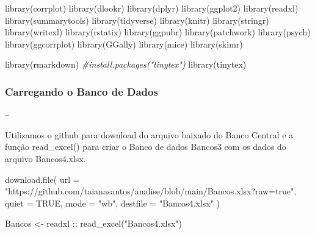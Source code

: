 \documentclass[
]{article}
\newenvironment{Shaded}{\begin{snugshade}}{\end{snugshade}}
\newcommand{\AttributeTok}[1]{\textcolor[rgb]{0.77,0.63,0.00}{#1}}
\newcommand{\CommentTok}[1]{\textcolor[rgb]{0.56,0.35,0.01}{\textit{#1}}}
\newcommand{\ConstantTok}[1]{\textcolor[rgb]{0.00,0.00,0.00}{#1}}
\newcommand{\FunctionTok}[1]{\textcolor[rgb]{0.00,0.00,0.00}{#1}}
\newcommand{\NormalTok}[1]{#1}
\newcommand{\OtherTok}[1]{\textcolor[rgb]{0.56,0.35,0.01}{#1}}
\newcommand{\SpecialCharTok}[1]{\textcolor[rgb]{0.00,0.00,0.00}{#1}}
\newcommand{\StringTok}[1]{\textcolor[rgb]{0.31,0.60,0.02}{#1}}
\begin{document}
\begin{Shaded}
\begin{Highlighting}[]
\FunctionTok{library}\NormalTok{(corrplot)}
\FunctionTok{library}\NormalTok{(dlookr)}
\FunctionTok{library}\NormalTok{(dplyr)}
\FunctionTok{library}\NormalTok{(ggplot2)}
\FunctionTok{library}\NormalTok{(readxl)}
\FunctionTok{library}\NormalTok{(summarytools)}
\FunctionTok{library}\NormalTok{(tidyverse)}
\FunctionTok{library}\NormalTok{(knitr)}
\FunctionTok{library}\NormalTok{(stringr)}
\FunctionTok{library}\NormalTok{(writexl)}
\FunctionTok{library}\NormalTok{(rstatix)}
\FunctionTok{library}\NormalTok{(ggpubr)}
\FunctionTok{library}\NormalTok{(patchwork)}
\FunctionTok{library}\NormalTok{(psych)}
\FunctionTok{library}\NormalTok{(ggcorrplot)}
\FunctionTok{library}\NormalTok{(GGally)}
\FunctionTok{library}\NormalTok{(mice)}
\FunctionTok{library}\NormalTok{(skimr)}

\FunctionTok{library}\NormalTok{(rmarkdown)}
\CommentTok{\#install.packages("tinytex")}
\FunctionTok{library}\NormalTok{(tinytex)}
\end{Highlighting}
\end{Shaded}

\hypertarget{carregando-o-banco-de-dados}{%
\subsubsection{Carregando o Banco de
Dados}\label{carregando-o-banco-de-dados}}

--

Utilizamos o github para download do arquivo baixado do Banco Central e
a função read\_excel() para criar o Banco de dados Bancos3 com os dados
do arquivo Bancos4.xlsx.

\begin{Shaded}
\begin{Highlighting}[]
\FunctionTok{download.file}\NormalTok{( }\AttributeTok{url =} \StringTok{"https://github.com/taianasantos/analise/blob/main/Bancos.xlsx?raw=true"}\NormalTok{, }\AttributeTok{quiet =} \ConstantTok{TRUE}\NormalTok{,  }\AttributeTok{mode =} \StringTok{"wb"}\NormalTok{, }\AttributeTok{destfile =} \StringTok{"Bancos4.xlsx"}\NormalTok{ )}

\NormalTok{Bancos }\OtherTok{\textless{}{-}}\NormalTok{ readxl }\SpecialCharTok{::} \FunctionTok{read\_excel}\NormalTok{(}\StringTok{"Bancos4.xlsx"}\NormalTok{)}
\end{Highlighting}
\end{Shaded}
\end{document}
